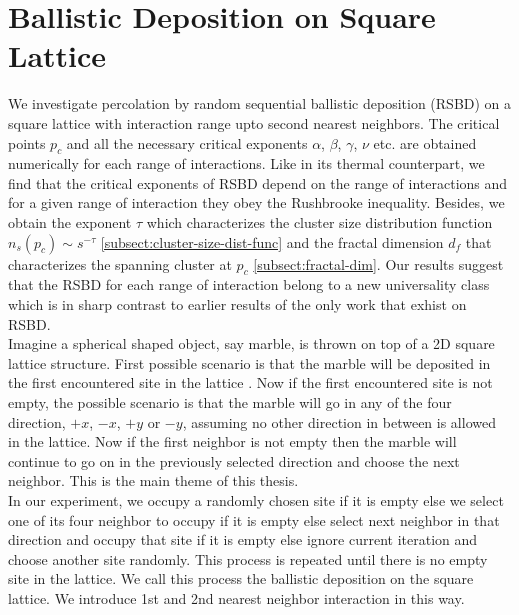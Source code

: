 \chapter{Ballistic Deposition on Square Lattice}

\ifpdf
    \graphicspath{{Chapter5/Figs/}{Chapter5/Figs/L0/}{Chapter5/Figs/L1/}{Chapter5/Figs/L2/}}
\else
    \graphicspath{{Chapter5/Figs/}{Chapter5/Figs/L0/}{Chapter5/Figs/L1/}{Chapter5/Figs/L2/}}
\fi


We investigate percolation by random sequential ballistic deposition (RSBD) on a square lattice with interaction range upto second nearest neighbors. The critical points $p_c$ and all the necessary critical exponents $\alpha$, $\beta$, $\gamma$, $\nu$ etc. are obtained numerically for  each range of interactions. Like  in its thermal counterpart, we find that the critical exponents of RSBD depend on the range of interactions and for a given range of interaction they obey the Rushbrooke inequality. Besides, we obtain the exponent $\tau$ which characterizes the cluster size distribution  function $n_s(p_c)\sim s^{-\tau}$ \ref{subsect:cluster-size-dist-func} and the fractal dimension $d_f$ that characterizes the spanning cluster at $p_c$ \ref{subsect:fractal-dim}. Our results suggest that the RSBD for each range of interaction belong to a new universality class which is in sharp contrast to earlier results of the only work that exhist on RSBD.
\\
Imagine a spherical shaped object, say marble, is thrown on top of a 2D square lattice structure. First possible scenario is that the marble will be deposited in the first encountered site in the lattice . Now if the first encountered site is not empty, the possible scenario is that the marble will go in any of the four direction, $+x$, $-x$, $+y$ or $-y$, assuming no other direction in between is allowed in the lattice.  Now if the first neighbor is not empty then the marble will continue to go on in the previously selected direction and choose the next neighbor. This is the main theme of this thesis.\\
In our experiment, we occupy a randomly chosen site if it is empty else we select one of its four neighbor to occupy if it is empty else select next neighbor in that direction and occupy that site if it is empty else ignore current iteration and choose another site randomly. This process is repeated until there is no empty site in the lattice. We call this process the ballistic deposition on the square lattice. We introduce 1st and 2nd nearest neighbor interaction in this way.

